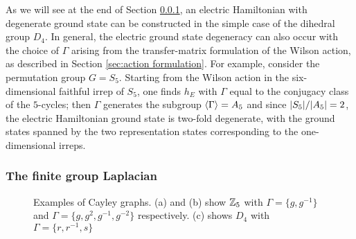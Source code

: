 As we will see at the end of Section \ref{sec:finitegrouplaplacian}, an electric Hamiltonian with degenerate ground state can be constructed in the simple case of the dihedral group $D_4$.
In general, the electric ground state degeneracy can also occur with the choice of $\Gamma$ arising from the transfer-matrix formulation of the Wilson action, as described in Section \ref{sec:action formulation}.
For example, consider the permutation group $G=S_5$. Starting from the Wilson action in the six-dimensional faithful irrep of $S_5$, one finds $h_E$ with $\Gamma$ equal to the conjugacy class of the $5$-cycles; then $\Gamma$ generates the subgroup $\expval{\Gamma} = A_5$ and since $\abs{S_5}/\abs{A_5}=2$, the electric Hamiltonian ground state is two-fold degenerate, with the ground states spanned by the two representation states corresponding to the one-dimensional irreps.

\subsubsection{The finite group Laplacian}\label{sec:finitegrouplaplacian}

\begin{figure}
    \centering
    
    \caption{Examples of Cayley graphs. (a) and (b) show $\mathbb{Z}_5$ with $\Gamma = \{g,g^{-1}\}$ and $\Gamma = \{g,g^2, g^{-1}, g^{-2}\}$ respectively. (c) shows $D_4$ with $\Gamma = \{r,r^{-1}, s\}$ }
    \label{fig:examples of Cayley graphs}
\end{figure}

